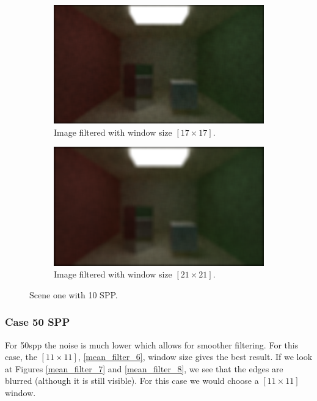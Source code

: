 \documentclass[titlepage,12pt]{report}
\begin{document}
\begin{figure}[H]
	\begin{subfigure}{.48\textwidth}
		\centering
		\includegraphics[scale=0.2]{media/mean/cornell_normal_10_mean_filter_17.png}
		\caption{Image filtered with window size $[17 \times 17]$.}
		\label{mean_filter_3}
	\end{subfigure}
	\begin{subfigure}{.48\textwidth}
		\centering
		\includegraphics[scale=0.2]{media/mean/cornell_normal_10_mean_filter_21.png}
		\caption{Image filtered with window size $[21 \times 21]$.}
		\label{mean_filter_4}
	\end{subfigure}
	\medskip
	\caption{Scene one with 10 SPP.}
	\label{mean_filter_01}
\end{figure}

\subsubsection{Case 50 SPP}

For 50spp the noise is much lower which allows for smoother filtering. For this case, the $[11\times 11]$, \ref{mean_filter_6}, window size gives the best result. If we look at Figures \ref{mean_filter_7} and \ref{mean_filter_8}, we see that the edges are blurred (although it is still visible). For this case we would choose a $[11\times 11]$ window.
\end{document}
